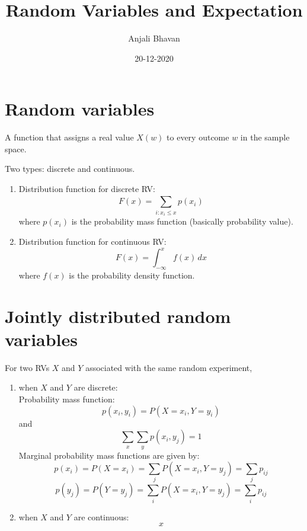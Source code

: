 \documentclass{article}
\title{Random Variables and Expectation}
\date{20-12-2020}
\author{Anjali Bhavan}
\begin{document}
\maketitle

\section{Random variables}
\begin{definition}
    A function that assigns a real value $ X(w) $ to every outcome $ w $ in the sample space.
\end{definition}
Two types: discrete and continuous. 
\begin{enumerate}
  \item Distribution function for discrete RV: 
  \begin{equation*}
  F(x) = \sum_{i:x_{i} \leq x}^{} p(x_{i})
  \end{equation*}
  where $ p(x_{i}) $ is the probability mass function (basically probability value).
  \item Distribution function for continuous RV:
  \begin{equation*}
  F(x) = \int_{-\infty}^{x} f(x) \,dx 
  \end{equation*}
  where $ f(x) $ is the probability density function.
\end{enumerate}

\section{Jointly distributed random variables}
For two RVs $ X $ and $ Y $ associated with the same random experiment,
\begin{enumerate}
  \item when $ X $ and $ Y $ are discrete: \\
  Probability mass function:
  \begin{equation*}
    p(x_{i}, y_{i}) = P(X = x_{i}, Y = y_{i})
  \end{equation*} 
  and
  \begin{equation*}
    \sum_{x}^{} \sum_{y}^{} p(x_{i}, y_{j}) = 1 
  \end{equation*}
  Marginal probability mass functions are given by: 
  \begin{equation*}
    p(x_{i}) = P(X = x_{i}) = \sum_{j}^{}P(X = x_{i}, Y = y_{j}) = \sum_{j}^{}p_{ij}
  \end{equation*}
  \begin{equation*}
    p(y_{j}) = P(Y = y_{j}) = \sum_{i}^{}P(X = x_{i}, Y = y_{j}) = \sum_{i}^{}p_{ij}
  \end{equation*}

\item when $ X $ and $ Y $ are continuous:
\begin{equation*}
x
\end{equation*}

\end{enumerate}
\end{document}
